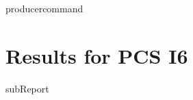 {{ producercommand }}
\renewcommand{\DTRPcs}{I6} %
\renewcommand{\DTRPcsLong}{I6}


    \section{Results for PCS \DTRPcsLong}

    {{subReport}}
    \newpage

